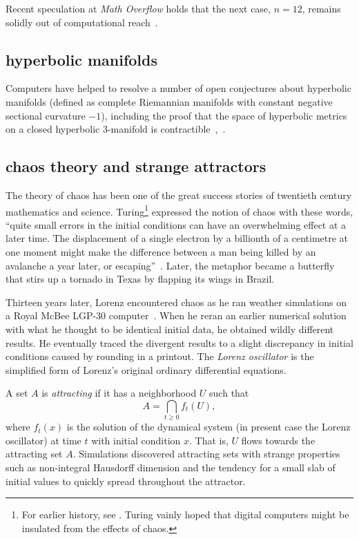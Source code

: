 \documentclass{llncs}
\begin{document}
Recent speculation at {\it Math Overflow} holds that the next case,
$n=12$, remains solidly out of computational reach~\cite{Horn}.



\subsection{hyperbolic manifolds}

Computers have helped to resolve a number of open conjectures about
hyperbolic manifolds (defined as complete Riemannian manifolds with
constant negative sectional curvature $-1$), including the proof that
the space of hyperbolic metrics on a closed hyperbolic $3$-manifold is
contractible~\cite{GMT},~\cite{GabICM}.


\subsection{chaos theory and strange attractors}

The theory of chaos has been one of the great success stories of
twentieth century mathematics and science.   Turing\footnote{For
  earlier history, see \cite[p.~971]{Wolfram:NKS}. Turing vainly hoped that
  digital computers might be insulated from the effects of chaos.}
expressed the notion of chaos with these words, ``quite small errors
in the initial conditions can have an overwhelming effect at a later
time.  The displacement of a single electron by a billionth of a
centimetre at one moment might make the difference between a man being
killed by an avalanche a year later, or escaping''~\cite{Tu50}.
Later, the metaphor became a butterfly
that stirs up a tornado in Texas by flapping its wings in Brazil.

Thirteen years later, Lorenz encountered chaos as he ran weather
simulations on a Royal McBee LGP-30 computer~\cite{Lo63}.  When he
reran an earlier numerical solution with what he thought to be
identical initial data, he obtained wildly different results.  He
eventually traced the divergent results to a slight discrepancy in
initial conditions caused by rounding in a printout.  The {\it Lorenz
  oscillator} is the simplified form of Lorenz's original ordinary
differential equations.

A set $A$ is {\it attracting} if it has a neighborhood $U$ such
that
\[
A = \bigcap_{t\ge 0} f_t(U),
\]
where $f_t(x)$ is the solution of the dynamical system (in present
case the Lorenz oscillator) at time $t$ with initial condition
$x$. That is, $U$ flows towards the attracting set $A$.  Simulations
discovered attracting sets with strange properties such as
non-integral Hausdorff dimension and the tendency for a small slab of
initial values to quickly spread throughout the attractor.
\end{document}
